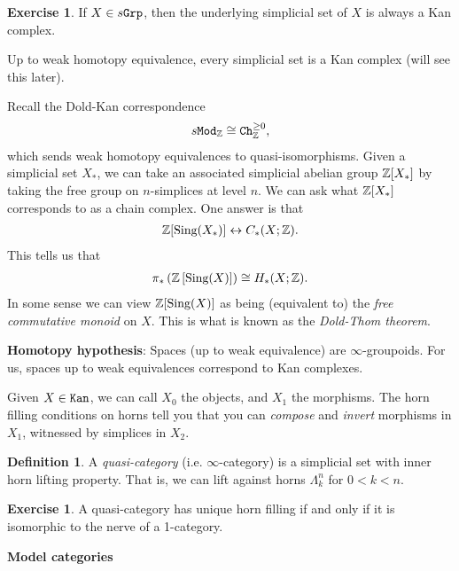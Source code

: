 \documentclass[12pt]{amsart}
\theoremstyle{definition}
\newtheorem{definition}[theorem]{Definition}
\newtheorem{exercise}[theorem]{Exercise}
\begin{document}
\begin{exercise} If $X \in s\texttt{Grp}$, then the underlying simplicial set of $X$ is always a Kan complex.
\end{exercise}

Up to weak homotopy equivalence, every simplicial set is a Kan complex (will see this later).

Recall the Dold-Kan correspondence
\begin{align*}
    s\texttt{Mod}_{\mathbb{Z}} \cong \texttt{Ch}_{\mathbb{Z}}^{\ge 0},
\end{align*}
which sends weak homotopy equivalences to quasi-isomorphisms. Given a simplicial set $X_\ast$, we can take an associated simplicial abelian group $\mathbb{Z}[X_\ast]$ by taking the free group on $n$-simplices at level $n$. We can ask what $\mathbb{Z}[X_\ast]$ corresponds to as a chain complex. One answer is that
\begin{align*}
    \mathbb{Z}[\text{Sing}(X_\ast)] \leftrightarrow C_\ast(X;\mathbb{Z}).
\end{align*}
This tells us that
\begin{align*}
    \pi_\ast \left( \mathbb{Z} \left[ \text{Sing}(X) \right] \right) \cong H_\ast(X;\mathbb{Z}).
\end{align*}
In some sense we can view $\mathbb{Z}[\text{Sing}(X)]$ as being (equivalent to) the \textit{free commutative monoid} on $X$. This is what is known as the \textit{Dold-Thom theorem}.

\textbf{Homotopy hypothesis}: Spaces (up to weak equivalence) are $\infty$-groupoids. For us, spaces up to weak equivalences correspond to Kan complexes.

Given $X\in \texttt{Kan}$, we can call $X_0$ the objects, and $X_1$ the morphisms. The horn filling conditions on horns tell you that you can \textit{compose} and \textit{invert} morphisms in $X_1$, witnessed by simplices in $X_2$.

\begin{definition} A \textit{quasi-category} (i.e. $\infty$-category) is a simplicial set with inner horn lifting property. That is, we can lift against horns $\Lambda^n_k$ for $0<k<n$.
\end{definition}

\begin{exercise} A quasi-category has unique horn filling if and only if it is isomorphic to the nerve of a 1-category.
\end{exercise}

\begin{center}
\textbf{Model categories}
\end{center}
\end{document}
